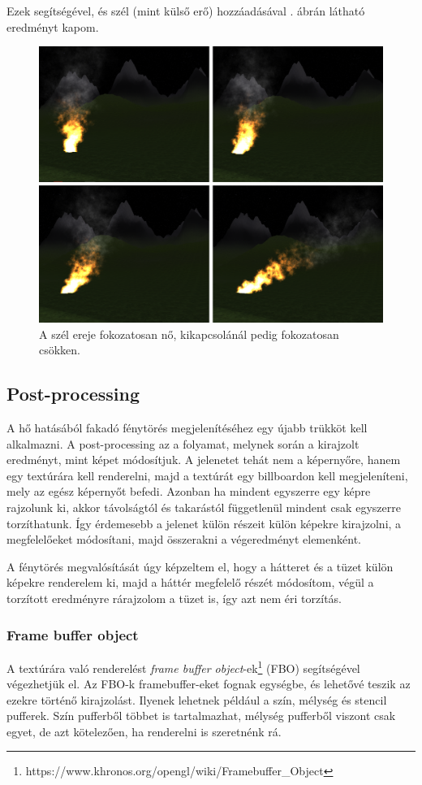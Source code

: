 Ezek segítségével, és szél (mint külső erő) hozzáadásával . ábrán látható eredményt kapom.
\begin{figure}[h]
 \centering
 \includegraphics[width=\textwidth]{kepek/particleWind.png}
 \caption{A szél ereje fokozatosan nő, kikapcsolánál pedig fokozatosan csökken.}
 \label{fig:particleWind}
\end{figure}

\subsection{Post-processing}
A hő hatásából fakadó fénytörés megjelenítéséhez egy újabb trükköt kell alkalmazni. A post-processing az a folyamat, melynek során a kirajzolt eredményt, mint képet módosítjuk. A jelenetet tehát nem a képernyőre, hanem egy textúrára kell renderelni, majd a textúrát egy billboardon kell megjeleníteni, mely az egész képernyőt befedi. Azonban ha mindent egyszerre egy képre rajzolunk ki, akkor távolságtól és takarástól függetlenül mindent csak egyszerre torzíthatunk. Így érdemesebb a jelenet külön részeit külön képekre kirajzolni, a megfelelőeket módosítani, majd összerakni a végeredményt elemenként.

A fénytörés megvalósítását úgy képzeltem el, hogy a hátteret és a tüzet külön képekre renderelem ki, majd a háttér megfelelő részét módosítom, végül a torzított eredményre rárajzolom a tüzet is, így azt nem éri torzítás.

\subsubsection{Frame buffer object}
A textúrára való renderelést \textit{frame buffer object}-ek\footnote{https://www.khronos.org/opengl/wiki/Framebuffer\_Object} (FBO) segítségével végezhetjük el. Az FBO-k framebuffer-eket fognak egységbe, és lehetővé teszik az ezekre történő kirajzolást. Ilyenek lehetnek például a szín, mélység és stencil pufferek. Szín pufferből többet is tartalmazhat, mélység pufferből viszont csak egyet, de azt kötelezően, ha renderelni is szeretnénk rá. 

